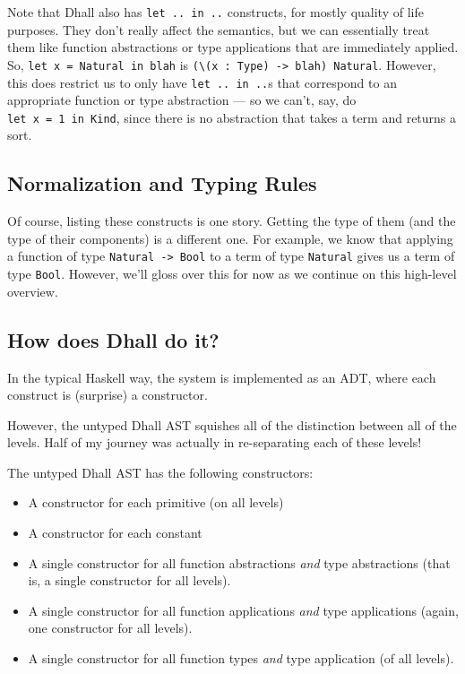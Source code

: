 \documentclass[]{article}
\begin{document}
Note that Dhall also has \texttt{let\ ..\ in\ ..} constructs, for mostly quality
of life purposes. They don't really affect the semantics, but we can essentially
treat them like function abstractions or type applications that are immediately
applied. So, \texttt{let\ x\ =\ Natural\ in\ blah} is
\texttt{(\textbackslash{}(x\ :\ Type)\ -\textgreater{}\ blah)\ Natural}.
However, this does restrict us to only have \texttt{let\ ..\ in\ ..}s that
correspond to an appropriate function or type abstraction --- so we can't, say,
do \texttt{let\ x\ =\ 1\ in\ Kind}, since there is no abstraction that takes a
term and returns a sort.

\hypertarget{normalization-and-typing-rules}{%
\subsection{Normalization and Typing
Rules}\label{normalization-and-typing-rules}}

Of course, listing these constructs is one story. Getting the type of them (and
the type of their components) is a different one. For example, we know that
applying a function of type \texttt{Natural\ -\textgreater{}\ Bool} to a term of
type \texttt{Natural} gives us a term of type \texttt{Bool}. However, we'll
gloss over this for now as we continue on this high-level overview.

\hypertarget{how-does-dhall-do-it}{%
\subsection{How does Dhall do it?}\label{how-does-dhall-do-it}}

In the typical Haskell way, the system is implemented as an ADT, where each
construct is (surprise) a constructor.

However, the untyped Dhall AST squishes all of the distinction between all of
the levels. Half of my journey was actually in re-separating each of these
levels!

The untyped Dhall AST has the following constructors:

\begin{itemize}
\tightlist
\item
  A constructor for each primitive (on all levels)
\item
  A constructor for each constant
\item
  A single constructor for all function abstractions \emph{and} type
  abstractions (that is, a single constructor for all levels).
\item
  A single constructor for all function applications \emph{and} type
  applications (again, one constructor for all levels).
\item
  A single constructor for all function types \emph{and} type application (of
  all levels).
\end{itemize}
\end{document}
